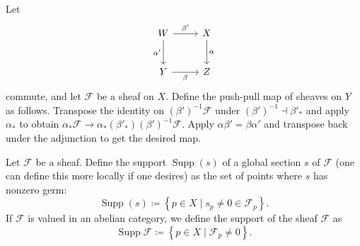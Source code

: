 \begin{definition}\label{dfn:2-7-3}
	Let
	\[\begin{tikzcd}[row sep = 2.5em, column sep = 2.5em]
	W \ar[" \beta ' ", r] \ar[" \alpha ' "', d]  & X \ar[" \alpha  ", d]  \\
	Y \ar[" \beta  "', r]  & Z
	\end{tikzcd}\]
	commute, and let $\mathcal{F} $ be a sheaf on $X$. Define the push-pull map of sheaves on $Y$ as follows. Transpose the identity on $(\beta ')^{-1} \mathcal{F} $ under $(\beta ')^{-1} \dashv \beta '_*$ and apply $\alpha _*$ to obtain $\alpha _* \mathcal{F} \to \alpha _*(\beta '_*)(\beta ')^{-1} \mathcal{F} $. Apply $\alpha \beta '=\beta \alpha '$ and transpose back under the adjunction to get the desired map.
\end{definition}


\begin{definition}\label{dfn:2-7-4}
	Let $\mathcal{F} $ be a sheaf. Define the support $\operatorname{Supp}(s)$ of a global section $s$ of $\mathcal{F} $ (one can define this more locally if one desires) as the set of points where $s$ has nonzero germ:
	\[
		\operatorname{Supp} (s)\coloneqq \left\{ p\in X\mid s_p \neq 0\in \mathcal{F} _p \right\} 
	.\]
	If $\mathcal{F} $ is valued in an abelian category, we define the support of the sheaf $\mathcal{F} $ as
	\[
		\operatorname{Supp} \mathcal{F} \coloneqq \left\{ p\in X\mid \mathcal{F} _p \neq 0 \right\} 
	.\]
\end{definition}

